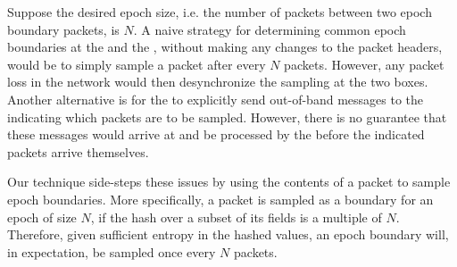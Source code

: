 Suppose the desired epoch size, i.e. the number of packets between two epoch boundary packets, is $N$. A naive strategy for determining common epoch boundaries at the \inbox and the \outbox, without making any changes to the packet headers, would be to simply sample a packet after every $N$ packets. However, any packet loss in the network would then desynchronize the sampling at the two boxes. Another alternative is for the \inbox to explicitly send out-of-band messages to the \outbox indicating which packets are to be sampled. However, there is no guarantee that these messages would arrive at and be processed by the \outbox before the indicated packets arrive themselves. 

Our technique side-steps these issues by using the contents of a packet to sample epoch boundaries. More specifically, a packet is sampled as a boundary for an epoch of size $N$, if the hash over a subset of its fields is a multiple of $N$. Therefore, given sufficient entropy in the hashed values, an epoch boundary will, in expectation, be sampled once every $N$ packets.

